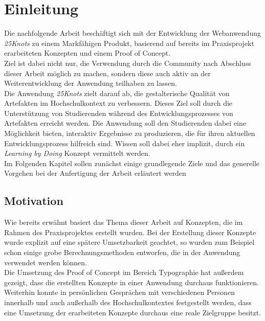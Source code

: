 \chapter{Einleitung}
\thispagestyle{fancy}
Die nachfolgende Arbeit beschäftigt sich mit der Entwicklung der Webanwendung \textit{25Knots} zu einem Markfähigen Produkt, basierend auf bereits im Praxisprojekt erarbeiteten Konzepten und einem Proof of Concept.\\
Ziel ist dabei nicht nur, die Verwendung durch die Community\footnotemark{} nach Abschluss dieser Arbeit möglich zu machen, sondern diese auch aktiv an der Weiterentwicklung der Anwendung teilhaben zu lassen.\\

Die Anwendung \textit{25Knots} zielt darauf ab, die gestalterische Qualität von Artefakten im Hochschulkontext zu verbessern. Dieses Ziel soll durch die Unterstützung von Studierenden während des Entwicklungsprozesses von Artefakten erreicht werden. Die Anwendung soll den Studierenden dabei eine Möglichkeit bieten, interaktiv Ergebnisse zu produzieren, die für ihren aktuellen Entwicklungsprozess hilfreich sind. Wissen soll dabei eher implizit, durch ein \textit{Learning by Doing} Konzept vermittelt werden.\\

Im Folgenden Kapitel sollen zunächst einige grundlegende Ziele und das generelle Vorgehen bei der Anfertigung der Arbeit erläutert werden


\section{Motivation}
Wie bereits erwähnt basiert das Thema dieser Arbeit auf Konzepten, die im Rahmen des Praxisprojektes  erstellt wurden. Bei der Erstellung dieser Konzepte wurde explizit auf eine spätere Umsetzbarkeit geachtet, so wurden zum Beispiel schon einige grobe Berechnungsmethoden entworfen, die in der Anwendung verwendet werden können.\\
Die Umsetzung des Proof of Concept im Bereich Typographie hat außerdem gezeigt, dass die erstellten Konzepte in einer Anwendung durchaus funktionieren.\\
Weiterhin konnte in persönlichen Gesprächen mit verschiedenen Personen innerhalb und auch außerhalb des Hochschulkontextes festgestellt werden, dass eine Umsetzung der erarbeiteten Konzepte durchaus eine reale Zielgruppe besitzt.\\

